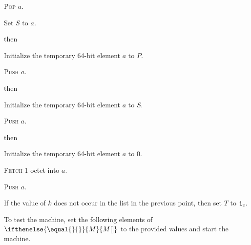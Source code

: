 \documentclass[a4paper,12pt]{article}
\newcommand{\num}[1]{\texttt{#1}}
\newcommand{\hex}[1]{\num{#1}_{\textup{\tiny 16}}}
\newcommand{\bin}[1]{\num{#1}_{\textup{\tiny 2}}}
\newcommand{\MEM}[1]{\ifthenelse{\equal{#1}{}}{M}{M[#1]}}
\newcommand{\PC}{P}
\newcommand{\SP}{S}
\newcommand{\TERM}{T}
\newcommand{\T}{\bin{1}}
\newcommand{\proc}[1]{\textsc{#1}}
\newcommand{\op}[1]{$#1$}
\newcommand{\GETPC}     [1]{\op{\hex{05}}}
\newcommand{\GETSP}     [1]{\op{\hex{06}}}
\newcommand{\PUSHB}     [1]{\op{\hex{08}}}
\begin{document}
\begin{stepnumbers}
\begin{description}
\begin{stepnumbers}
    \item \proc{Pop} $a$.
    \item Set $\SP$ to $a$.
    \end{stepnumbers}
  \item[\GETPC{}] then
    \begin{stepnumbers}
    \item Initialize the temporary 64-bit element $a$ to $\PC$.
    \item \proc{Push} $a$.
    \end{stepnumbers}
  \item[\GETSP{}] then
    \begin{stepnumbers}
    \item Initialize the temporary 64-bit element $a$ to $\SP$.
    \item \proc{Push} $a$.
    \end{stepnumbers}
  \item[\PUSHB{}] then
    \begin{stepnumbers}
    \item Initialize the temporary 64-bit element $a$ to 0.
    \item \proc{Fetch} 1 octet into $a$.
    \item \proc{Push} $a$.
    \end{stepnumbers}
  \end{description}
\item If the value of $k$ does not occur in the list in the previous point, then set $\TERM$ to $\T$.
\end{stepnumbers}
To test the machine, set the following elements of $\MEM{}$ to the provided values and start the machine.
\end{document}
